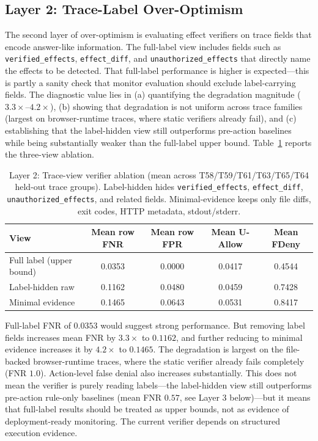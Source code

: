 \documentclass{article}
\begin{document}
\subsection{Layer 2: Trace-Label Over-Optimism}

The second layer of over-optimism is evaluating effect verifiers on trace fields that encode answer-like information. The full-label view includes fields such as \texttt{verified\_effects}, \texttt{effect\_diff}, and \texttt{unauthorized\_effects} that directly name the effects to be detected. That full-label performance is higher is expected---this is partly a sanity check that monitor evaluation should exclude label-carrying fields. The diagnostic value lies in (a) quantifying the degradation magnitude ($3.3\times$--$4.2\times$), (b) showing that degradation is not uniform across trace families (largest on browser-runtime traces, where static verifiers already fail), and (c) establishing that the label-hidden view still outperforms pre-action baselines while being substantially weaker than the full-label upper bound. Table~\ref{tab:layer2} reports the three-view ablation.

\begin{table}[t]
\centering
\caption{Layer 2: Trace-view verifier ablation (mean across T58/T59/T61/T63/T65/T64 held-out trace groups). Label-hidden hides \texttt{verified\_effects}, \texttt{effect\_diff}, \texttt{unauthorized\_effects}, and related fields. Minimal-evidence keeps only file diffs, exit codes, HTTP metadata, stdout/stderr.}
\label{tab:layer2}
\begin{tabular}{lcccc}
\toprule
View & Mean row FNR & Mean row FPR & Mean U-Allow & Mean FDeny \\
\midrule
Full label (upper bound) & 0.0353 & 0.0000 & 0.0417 & 0.4544 \\
Label-hidden raw & 0.1162 & 0.0480 & 0.0459 & 0.7428 \\
Minimal evidence & 0.1465 & 0.0643 & 0.0531 & 0.8417 \\
\bottomrule
\end{tabular}
\end{table}

Full-label FNR of $0.0353$ would suggest strong performance. But removing label fields increases mean FNR by $3.3\times$ to $0.1162$, and further reducing to minimal evidence increases it by $4.2\times$ to $0.1465$. The degradation is largest on the file-backed browser-runtime traces, where the static verifier already fails completely (FNR $1.0$). Action-level false denial also increases substantially. This does not mean the verifier is purely reading labels---the label-hidden view still outperforms pre-action rule-only baselines (mean FNR $0.57$, see Layer 3 below)---but it means that full-label results should be treated as upper bounds, not as evidence of deployment-ready monitoring. The current verifier depends on structured execution evidence.
\end{document}
